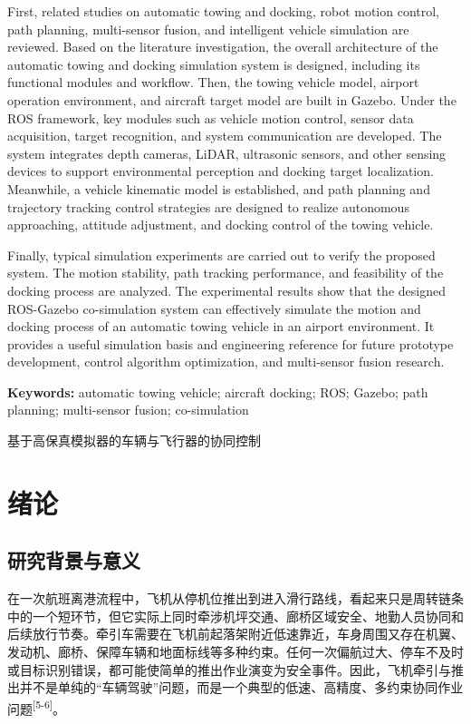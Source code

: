 \documentclass[UTF8,a4paper,12pt]{ctexart}
\newcommand{\sanhao}{\zihao{3}}
\begin{document}
First, related studies on automatic towing and docking, robot motion control, path planning, multi-sensor fusion, and intelligent vehicle simulation are reviewed. Based on the literature investigation, the overall architecture of the automatic towing and docking simulation system is designed, including its functional modules and workflow. Then, the towing vehicle model, airport operation environment, and aircraft target model are built in Gazebo. Under the ROS framework, key modules such as vehicle motion control, sensor data acquisition, target recognition, and system communication are developed. The system integrates depth cameras, LiDAR, ultrasonic sensors, and other sensing devices to support environmental perception and docking target localization. Meanwhile, a vehicle kinematic model is established, and path planning and trajectory tracking control strategies are designed to realize autonomous approaching, attitude adjustment, and docking control of the towing vehicle.

Finally, typical simulation experiments are carried out to verify the proposed system. The motion stability, path tracking performance, and feasibility of the docking process are analyzed. The experimental results show that the designed ROS-Gazebo co-simulation system can effectively simulate the motion and docking process of an automatic towing vehicle in an airport environment. It provides a useful simulation basis and engineering reference for future prototype development, control algorithm optimization, and multi-sensor fusion research.

\textbf{Keywords:} automatic towing vehicle; aircraft docking; ROS; Gazebo; path planning; multi-sensor fusion; co-simulation

\begin{center}
{\sanhao\heiti 基于高保真模拟器的车辆与飞行器的协同控制}
\end{center}

\section{绪论}\label{_Toc229105288}

\subsection{研究背景与意义}\label{_Toc229105289}

在一次航班离港流程中，飞机从停机位推出到进入滑行路线，看起来只是周转链条中的一个短环节，但它实际上同时牵涉机坪交通、廊桥区域安全、地勤人员协同和后续放行节奏。牵引车需要在飞机前起落架附近低速靠近，车身周围又存在机翼、发动机、廊桥、保障车辆和地面标线等多种约束。任何一次偏航过大、停车不及时或目标识别错误，都可能使简单的推出作业演变为安全事件。因此，飞机牵引与推出并不是单纯的``车辆驾驶''问题，而是一个典型的低速、高精度、多约束协同作业问题\textsuperscript{[5-6]}。
\end{document}
